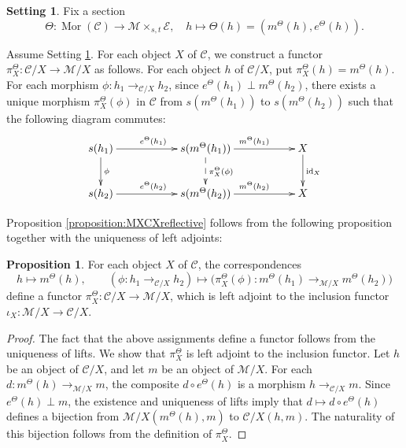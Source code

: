 \documentclass[12pt, a4paper]{amsart}
\theoremstyle{definition}
\newtheorem{proposition}[theorem]{Proposition}
\newtheorem{setting}[theorem]{Setting}
\newcommand{\id}{\mathop{\mathrm{id}}\nolimits}
\newcommand{\Mor}{\mathop{\mathrm{Mor}}\nolimits}
\begin{document}
\begin{setting}\label{setting:section_EMfact}
Fix a section
\[
\Theta : \Mor(\mathcal{C}) \rightarrow \mathcal{M} \times_{s,t} \mathcal{E}, \quad h \mapsto \Theta(h) = (m^{\Theta}(h),e^{\Theta}(h)).
\]
\end{setting}

Assume Setting \ref{setting:section_EMfact}. For each object $X$ of $\mathcal{C}$, we construct a functor $\pi^{\Theta}_X : \mathcal{C}/X \rightarrow \mathcal{M}/X$ as follows. For each object $h$ of $\mathcal{C}/X$, put $\pi^\Theta_X(h) = m^{\Theta}(h)$. For each morphism $\phi : h_1 \rightarrow_{\mathcal{C}/X} h_2$, since $e^{\Theta}(h_1) \perp m^{\Theta}(h_2)$, there exists a unique morphism $\pi^\Theta_X(\phi)$ in $\mathcal{C}$ from $s(m^{\Theta}(h_1))$ to $s(m^{\Theta}(h_2))$ such that the following diagram commutes:
\[
\xymatrix@C=5.5em{
s(h_1) \ar[r]^{e^{\Theta}(h_1)} \ar[d]^{\phi} & s(m^{\Theta}(h_1)) \ar[r]^{m^{\Theta}(h_1)} \ar@{-->}[d]^{\pi^\Theta_X(\phi)} & X \ar[d]^{\id_X} \\
s(h_2) \ar[r]^{e^{\Theta}(h_2)} & s(m^{\Theta}(h_2)) \ar[r]^{m^{\Theta}(h_2)} & X
}
\]

Proposition \ref{proposition:MXCXreflective} follows from the following proposition together with the uniqueness of left adjoints:

\begin{proposition}
For each object $X$ of $\mathcal{C}$, the correspondences
\[
h \mapsto m^{\Theta}(h),
\qquad
(\phi : h_1 \rightarrow_{\mathcal{C}/X} h_2) \mapsto \bigl(\pi^\Theta_X(\phi) : m^{\Theta}(h_1) \rightarrow_{\mathcal{M}/X} m^{\Theta}(h_2)\bigr)
\]
define a functor $\pi^\Theta_X : \mathcal{C}/X \rightarrow \mathcal{M}/X$, which is left adjoint to the inclusion functor $\iota_X : \mathcal{M}/X \rightarrow \mathcal{C}/X$.
\end{proposition}

\begin{proof}
The fact that the above assignments define a functor follows from the uniqueness of lifts. We show that $\pi^\Theta_X$ is left adjoint to the inclusion functor. Let $h$ be an object of $\mathcal{C}/X$, and let $m$ be an object of $\mathcal{M}/X$. For each $d : m^{\Theta}(h) \rightarrow_{\mathcal{M}/X} m$, the composite $d \circ e^{\Theta}(h)$ is a morphism $h \rightarrow_{\mathcal{C}/X} m$. Since $e^{\Theta}(h) \perp m$, the existence and uniqueness of lifts imply that $d \mapsto d \circ e^{\Theta}(h)$ defines a bijection from $\mathcal{M}/X(m^{\Theta}(h),m)$ to $\mathcal{C}/X(h,m)$. The naturality of this bijection follows from the definition of $\pi^\Theta_X$.
\end{proof}
\end{document}
